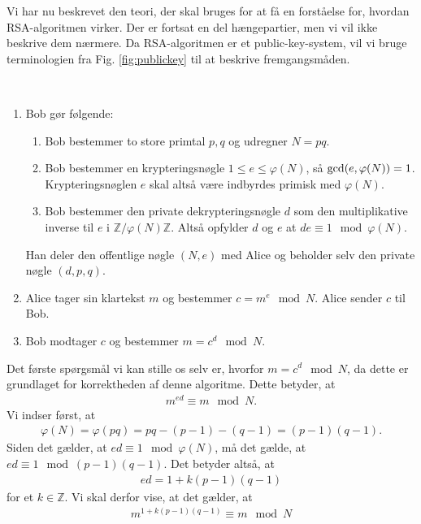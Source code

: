\documentclass[12pt]{article}
\begin{document}
Vi har nu beskrevet den teori, der skal bruges for at få en forståelse for, hvordan RSA-algoritmen virker. Der er fortsat en del hængepartier, men vi vil ikke beskrive dem nærmere. Da RSA-algoritmen er et public-key-system, vil vi bruge terminologien fra Fig. \ref{fig:publickey} til at beskrive fremgangsmåden. 
\begin{defn}
\phantom{hej}\\
\begin{enumerate}
\item Bob gør følgende:
\begin{enumerate}[label=\roman*)]
\item Bob bestemmer to store primtal $p,q$ og udregner $N = pq$.
\item Bob bestemmer en krypteringsnøgle $1\leq e \leq \varphi(N)$, så $\textnormal{gcd}(e,\varphi(N)) = 1$. Krypteringsnøglen $e$ skal altså være indbyrdes primisk med $\varphi(N)$. 
\item Bob bestemmer den private dekrypteringsnøgle $d$ som den multiplikative inverse til $e$ i $\mathbb{Z}/\varphi(N)\mathbb{Z}$. Altså opfylder $d$ og $e$ at $de \equiv 1 \mod{\varphi(N)}$.
\end{enumerate}
Han deler den offentlige nøgle $(N,e)$ med Alice og beholder selv den private nøgle $(d,p,q)$. 

\item Alice tager sin klartekst $m$ og bestemmer $c = m^e \mod{N}$. Alice sender $c$ til Bob.
\item Bob modtager $c$ og bestemmer $m = c^d \mod{N}$.  
\end{enumerate}
\end{defn}
Det første spørgsmål vi kan stille os selv er, hvorfor $m = c^d \mod{N}$, da dette er grundlaget for korrektheden af denne algoritme. Dette betyder, at 
\begin{align*}
m^{ed} \equiv m \mod{N}.
\end{align*}
Vi indser først, at 
\begin{align*}
\varphi(N) = \varphi(pq) = pq-(p-1) -(q - 1) = (p-1)(q-1).
\end{align*} 
Siden det gælder, at $ed \equiv 1 \mod{\varphi(N)}$, må det gælde, at $ed \equiv 1 \mod{(p-1)(q-1)}$. Det betyder altså, at 
\begin{align*}
ed = 1 + k(p-1)(q-1)
\end{align*}
for et $k\in \mathbb{Z}$. Vi skal derfor vise, at det gælder, at 
\begin{align*}
m^{1+k(p-1)(q-1)} \equiv m \mod{N}
\end{align*}
\end{document}
